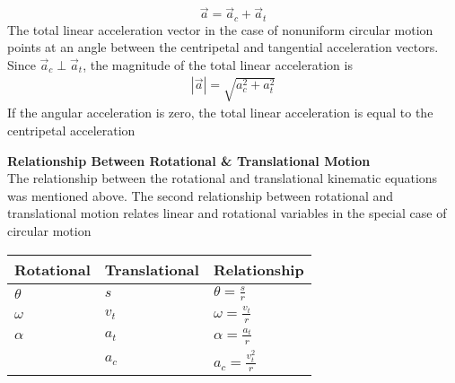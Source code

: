 \documentclass[a4paper]{article}
\let\bf\textbf
\begin{document}
\begin{equation}
    \vec{a} = \vec{a}_c + \vec{a}_t
\end{equation}
The total linear acceleration vector in the case of nonuniform circular motion points at an angle between the centripetal and tangential acceleration vectors. Since $\vec{a}_c \perp \vec{a}_t$, the magnitude of the total linear acceleration is
\begin{align*}
    |\vec{a}| = \sqrt{a_c^2 + a_t^2}
\end{align*}
If the angular acceleration is zero, the total linear acceleration is equal to the centripetal acceleration
\begin{center}
\end{center}

\noindent\bf{Relationship Between Rotational \& Translational Motion}
\vspace{2mm}\\
The relationship between the rotational and translational kinematic equations was mentioned above. The second relationship between rotational and translational motion relates linear and rotational variables in the special case of circular motion
\begin{center}
    \begin{tabularx}{0.4\textwidth}{ 
        | >{\raggedright\arraybackslash}X
        | >{\raggedright\arraybackslash}X  
        | >{\raggedright\arraybackslash}X |}
        \hline
        Rotational & Translational & Relationship\\[2.5pt]
        \hline
        $\theta$ & $s$ & $\theta = \frac{s}{r}$\\[2.5pt]
        \hline
        $\omega$ & $v_t$ & $\omega = \frac{v_t}{r}$\\[2.5pt]
        \hline
        $\alpha$ & $a_t$ & $\alpha = \frac{a_t}{r}$\\[2.5pt]
        \hline
        & $a_c$ & $a_c = \frac{v_t^2}{r}$\\[2.5pt]
        \hline
    \end{tabularx}
\end{center}
\end{document}
